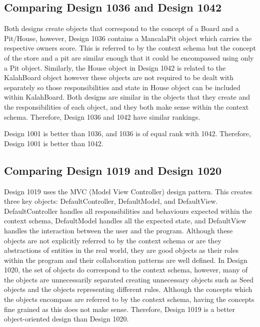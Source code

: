 \documentclass[conference]{IEEEtran}
\begin{document}
\subsection{Comparing Design 1036 and Design 1042}
Both designs create objects that correspond to the concept of a Board and a Pit/House, however, Design 1036 contains a MancalaPit object which carries the respective owners score. This is referred to by the context schema but the concept of the store and a pit are similar enough that it could be encompassed using only a Pit object. Similarly, the House object in Design 1042 is related to the KalahBoard object however these objects are not required to be dealt with separately so those responsibilities and state in House object can be included within KalahBoard. Both designs are similar in the objects that they create and the responsibilities of each object, and they both make sense within the context schema. Therefore, Design 1036 and 1042 have similar rankings.

Design 1001 is better than 1036, and 1036 is of equal rank with 1042. Therefore, Design 1001 is better than 1042.

\subsection{Comparing Design 1019 and Design 1020}
Design 1019 uses the MVC (Model View Controller) design pattern. This creates three key objects: DefaultController, DefaultModel, and DefaultView. DefaultController handles all responsibilities and behaviours expected within the context schema, DefaultModel handles all the expected state, and DefaultView handles the interaction between the user and the program. Although these objects are not explicitly referred to by the context schema or are they abstractions of entities in the real world, they are good objects as their roles within the program and their collaboration patterns are well defined. In Design 1020, the set of objects do correspond to the context schema, however, many of the objects are unnecessarily separated creating unnecessary objects such as Seed objects and the objects representing different rules. Although the concepts which the objects encompass are referred to by the context schema, having the concepts fine grained as this does not make sense. Therefore, Design 1019 is a better object-oriented design than Design 1020.
\end{document}
